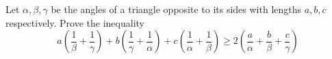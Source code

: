 Let $\alpha,\beta,\gamma$ be the angles of a triangle opposite to its sides with lengths $a,b,c$ respectively. Prove the inequality\[a\left(\frac{1}{\beta}+\frac{1}{\gamma}\right)+b\left(\frac{1}{\gamma}+\frac{1}{\alpha}\right)+c\left(\frac{1}{\alpha}+\frac{1}{\beta}\right)\ge2\left(\frac{a}{\alpha}+\frac{b}{\beta}+\frac{c}{\gamma}\right)\]